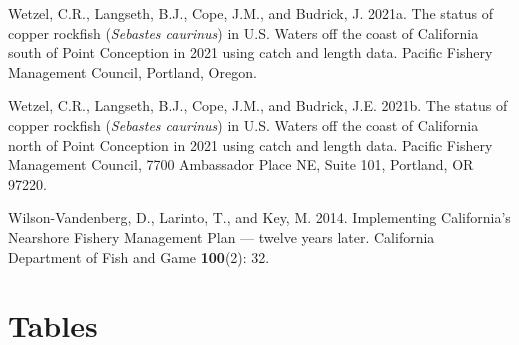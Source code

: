 \documentclass[11pt,
  english,
  letterpaper,
]{article}
\newlength{\cslhangindent}
\newenvironment{CSLReferences}[2] %
 {%
  \setlength{\parindent}{0pt}
  \ifodd #1 \everypar{\setlength{\hangindent}{\cslhangindent}}\ignorespaces\fi
  \ifnum #2 > 0
  \setlength{\parskip}{#2\baselineskip}
  \fi
 }%
 {}
\begin{document}
\begin{CSLReferences}{1}{0}
\leavevmode{}%
Wetzel, C.R., Langseth, B.J., Cope, J.M., and Budrick, J. 2021a. The status of copper rockfish (\emph{{Sebastes} caurinus}) in {U}.{S}. Waters off the coast of {California} south of {Point} {Conception} in 2021 using catch and length data. Pacific Fishery Management Council, Portland, Oregon.

\leavevmode{}%
Wetzel, C.R., Langseth, B.J., Cope, J.M., and Budrick, J.E. 2021b. The status of copper rockfish (\emph{{Sebastes} caurinus}) in {U}.{S}. Waters off the coast of {California} north of {Point} {Conception} in 2021 using catch and length data. Pacific Fishery Management Council, 7700 Ambassador Place NE, Suite 101, Portland, OR 97220.

\leavevmode{}%
Wilson-Vandenberg, D., Larinto, T., and Key, M. 2014. Implementing {California}'s {Nearshore} {Fishery} {Management} {Plan} --- twelve years later. California Department of Fish and Game \textbf{100}(2): 32.

\end{CSLReferences}

\clearpage

\hypertarget{tables}{%
\section{Tables}\label{tables}}

\begingroup\fontsize{10}{12}\selectfont
\begingroup\fontsize{10}{12}\selectfont
\end{document}
